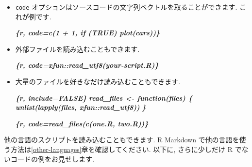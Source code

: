 \documentclass[
  11pt,
]{bxjsreport}
\newenvironment{Shaded}{\begin{snugshade}}{\end{snugshade}}
\newcommand{\InformationTok}[1]{\textcolor[rgb]{0.56,0.35,0.01}{\textbf{\textit{#1}}}}
\begin{document}
\begin{itemize}
\item
  \texttt{code} オプションはソースコードの文字列ベクトルを取ることができます. これが例です.

\begin{Shaded}
\begin{Highlighting}[]
\InformationTok{\textasciigrave{}\textasciigrave{}\textasciigrave{}\{r, code=c(\textquotesingle{}1 + 1\textquotesingle{}, \textquotesingle{}if (TRUE) plot(cars)\textquotesingle{})\}}
\InformationTok{\textasciigrave{}\textasciigrave{}\textasciigrave{}}
\end{Highlighting}
\end{Shaded}
\item
  外部ファイルを読み込むこともできます.

\begin{Shaded}
\begin{Highlighting}[]
\InformationTok{\textasciigrave{}\textasciigrave{}\textasciigrave{}\{r, code=xfun::read\_utf8(\textquotesingle{}your{-}script.R\textquotesingle{})\}}
\InformationTok{\textasciigrave{}\textasciigrave{}\textasciigrave{}}
\end{Highlighting}
\end{Shaded}
\item
  大量のファイルを好きなだけ読み込むこともできます.

\begin{Shaded}
\begin{Highlighting}[]
\InformationTok{\textasciigrave{}\textasciigrave{}\textasciigrave{}\{r, include=FALSE\}}
\InformationTok{read\_files \textless{}{-} function(files) \{}
\InformationTok{  unlist(lapply(files, xfun::read\_utf8))}
\InformationTok{\}}
\InformationTok{\textasciigrave{}\textasciigrave{}\textasciigrave{}}

\InformationTok{\textasciigrave{}\textasciigrave{}\textasciigrave{}\{r, code=read\_files(c(\textquotesingle{}one.R\textquotesingle{}, \textquotesingle{}two.R\textquotesingle{}))\}}
\InformationTok{\textasciigrave{}\textasciigrave{}\textasciigrave{}}
\end{Highlighting}
\end{Shaded}
\end{itemize}

他の言語のスクリプトを読み込むこともできます. R Markdown で他の言語を使う方法は\ref{other-languages}章を確認してください. 以下に, さらに少しだけ R でないコードの例をお見せします.
\end{document}

